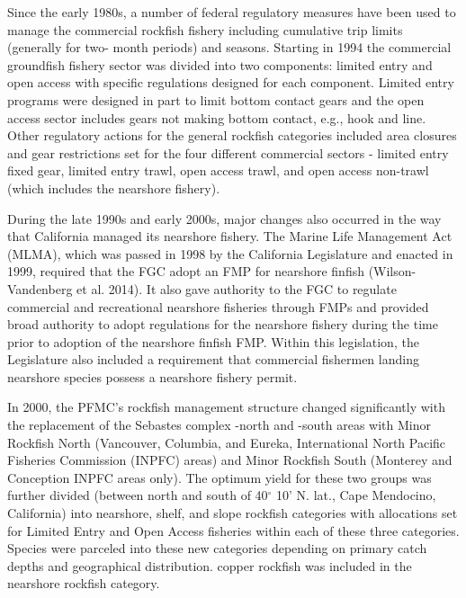 \documentclass[11pt,
  english,
  letterpaper,
]{article}
\begin{document}
Since the early 1980s, a number of federal regulatory measures have been used to manage the commercial rockfish fishery including cumulative trip limits (generally for two- month periods) and seasons. Starting in 1994 the commercial groundfish fishery sector was divided into two components: limited entry and open access with specific regulations designed for each component. Limited entry programs were designed in part to limit bottom contact gears and the open access sector includes gears not making bottom contact, e.g., hook and line. Other regulatory actions for the general rockfish categories included area closures and gear restrictions set for the four different commercial sectors - limited entry fixed gear, limited entry trawl, open access trawl, and open access non-trawl (which includes the nearshore fishery).

During the late 1990s and early 2000s, major changes also occurred in the way that California managed its nearshore fishery. The Marine Life Management Act (MLMA), which was passed in 1998 by the California Legislature and enacted in 1999, required that the FGC adopt an FMP for nearshore finfish (Wilson-Vandenberg et al. 2014). It also gave authority to the FGC to regulate commercial and recreational nearshore fisheries through FMPs and provided broad authority to adopt regulations for the nearshore fishery during the time prior to adoption of the nearshore finfish FMP. Within this legislation, the Legislature also included a requirement that commercial fishermen landing nearshore species possess a nearshore fishery permit.

In 2000, the PFMC's rockfish management structure changed significantly with the replacement of the Sebastes complex -north and -south areas with Minor Rockfish North (Vancouver, Columbia, and Eureka, International North Pacific Fisheries Commission (INPFC) areas) and Minor Rockfish South (Monterey and Conception INPFC areas only). The optimum yield for these two groups was further divided (between north and south of 40\(^\circ\) 10' N. lat., Cape Mendocino, California) into nearshore, shelf, and slope rockfish categories with allocations set for Limited Entry and Open Access fisheries within each of these three categories. Species were parceled into these new categories depending on primary catch depths and geographical distribution. copper rockfish was included in the nearshore rockfish category.
\end{document}
